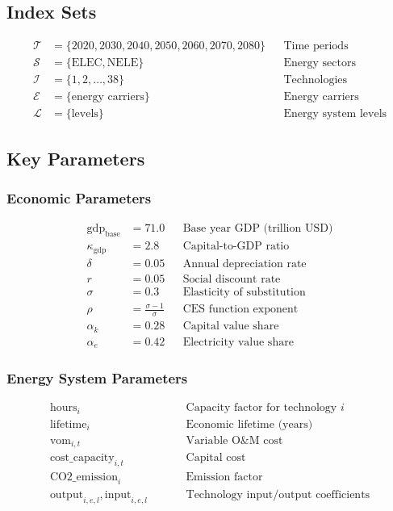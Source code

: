 \documentclass[11pt]{article}
\begin{document}
\subsection{Index Sets}
\begin{align}
\mathcal{T} &= \{2020, 2030, 2040, 2050, 2060, 2070, 2080\} && \text{Time periods} \\
\mathcal{S} &= \{\text{ELEC}, \text{NELE}\} && \text{Energy sectors} \\
\mathcal{I} &= \{1, 2, \ldots, 38\} && \text{Technologies} \\
\mathcal{E} &= \{\text{energy carriers}\} && \text{Energy carriers} \\
\mathcal{L} &= \{\text{levels}\} && \text{Energy system levels}
\end{align}

\subsection{Key Parameters}

\subsubsection{Economic Parameters}
\begin{align}
\text{gdp}_{\text{base}} &= 71.0 && \text{Base year GDP (trillion USD)} \\
\kappa_{\text{gdp}} &= 2.8 && \text{Capital-to-GDP ratio} \\
\delta &= 0.05 && \text{Annual depreciation rate} \\
r &= 0.05 && \text{Social discount rate} \\
\sigma &= 0.3 && \text{Elasticity of substitution} \\
\rho &= \frac{\sigma - 1}{\sigma} && \text{CES function exponent} \\
\alpha_k &= 0.28 && \text{Capital value share} \\
\alpha_e &= 0.42 && \text{Electricity value share}
\end{align}

\subsubsection{Energy System Parameters}
\begin{align}
\text{hours}_i &\quad && \text{Capacity factor for technology } i \\
\text{lifetime}_i &\quad && \text{Economic lifetime (years)} \\
\text{vom}_{i,t} &\quad && \text{Variable O\&M cost} \\
\text{cost\_capacity}_{i,t} &\quad && \text{Capital cost} \\
\text{CO2\_emission}_i &\quad && \text{Emission factor} \\
\text{output}_{i,e,l}, \text{input}_{i,e,l} &\quad && \text{Technology input/output coefficients}
\end{align}
\end{document}
